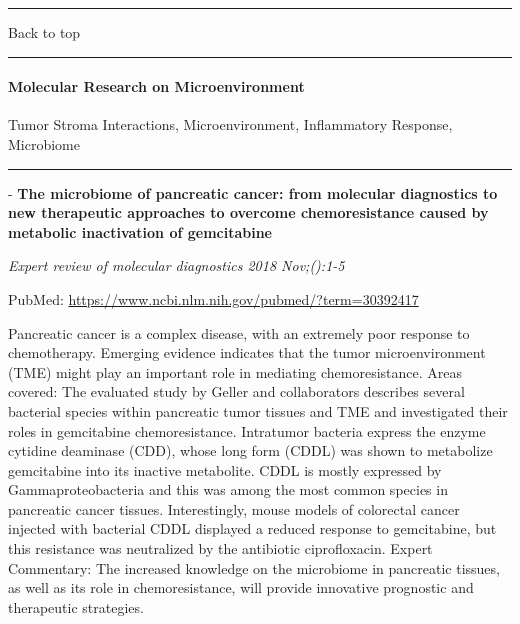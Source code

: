 \documentclass[]{article}
\let\oldparagraph\paragraph
\renewcommand{\paragraph}[1]{\oldparagraph{#1}\mbox{}}
\begin{document}
{}

{}

\begin{center}\rule{0.5\linewidth}{\linethickness}\end{center}

Back to top

\begin{center}\rule{0.5\linewidth}{\linethickness}\end{center}

\pagebreak

\hypertarget{molecular-research-on-microenvironment}{%
\paragraph{Molecular Research on
Microenvironment}\label{molecular-research-on-microenvironment}}

Tumor Stroma Interactions, Microenvironment, Inflammatory Response,
Microbiome

\begin{center}\rule{0.5\linewidth}{\linethickness}\end{center}

 - \textbf{The microbiome of pancreatic cancer: from molecular
diagnostics to new therapeutic approaches to overcome chemoresistance
caused by metabolic inactivation of gemcitabine}

\emph{Expert review of molecular diagnostics 2018 Nov;():1-5}

PubMed: \url{https://www.ncbi.nlm.nih.gov/pubmed/?term=30392417}

Pancreatic cancer is a complex disease, with an extremely poor response
to chemotherapy. Emerging evidence indicates that the tumor
microenvironment (TME) might play an important role in mediating
chemoresistance. Areas covered: The evaluated study by Geller and
collaborators describes several bacterial species within pancreatic
tumor tissues and TME and investigated their roles in gemcitabine
chemoresistance. Intratumor bacteria express the enzyme cytidine
deaminase (CDD), whose long form (CDDL) was shown to metabolize
gemcitabine into its inactive metabolite. CDDL is mostly expressed by
Gammaproteobacteria and this was among the most common species in
pancreatic cancer tissues. Interestingly, mouse models of colorectal
cancer injected with bacterial CDDL displayed a reduced response to
gemcitabine, but this resistance was neutralized by the antibiotic
ciprofloxacin. Expert Commentary: The increased knowledge on the
microbiome in pancreatic tissues, as well as its role in
chemoresistance, will provide innovative prognostic and therapeutic
strategies.
\end{document}
